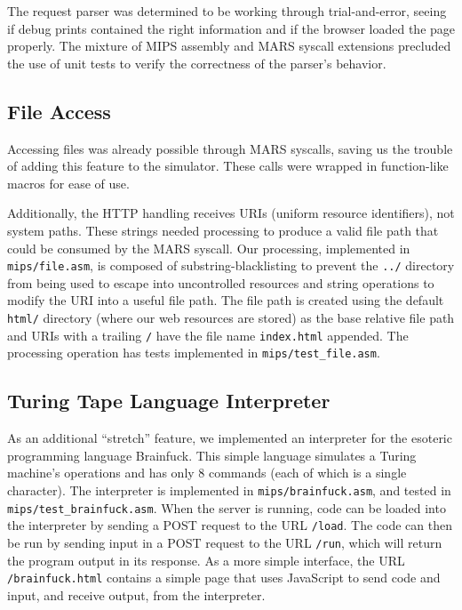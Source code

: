 \documentclass[journal,10pt]{IEEEtran}
\begin{document}
The request parser was determined to be working through trial-and-error, seeing
if debug prints contained the right information and if the browser loaded the
page properly. The mixture of MIPS assembly and MARS syscall extensions
precluded the use of unit tests to verify the correctness of the parser's
behavior.

\subsection{File Access}

Accessing files was already possible through MARS syscalls, saving us the
trouble of adding this feature to the simulator. These calls were wrapped in
function-like macros for ease of use.

Additionally, the HTTP handling receives URIs (uniform resource identifiers),
not system paths. These strings needed processing to produce a valid file path
that could be consumed by the MARS syscall. Our processing, implemented in
\texttt{mips/file.asm}, is composed of substring-blacklisting to prevent the
\texttt{../} directory from being used to escape into uncontrolled resources and
string operations to modify the URI into a useful file path. The file path is
created using the default \texttt{html/} directory (where our web resources are
stored) as the base relative file path and URIs with a trailing \texttt{/} have
the file name \texttt{index.html} appended. The processing operation has tests
implemented in \texttt{mips/test\_file.asm}.

\subsection{Turing Tape Language Interpreter}

As an additional ``stretch'' feature, we implemented an interpreter for the
esoteric programming language Brainfuck\cite{Mpreu/preller}.  This simple
language simulates a Turing machine's operations and has only 8 commands (each
of which is a single character).  The interpreter is implemented in
\texttt{mips/brainfuck.asm}, and tested in \texttt{mips/test\_brainfuck.asm}.
When the server is running, code can be loaded into the interpreter by sending a
POST request to the URL \texttt{/load}.  The code can then be run by sending
input in a POST request to the URL \texttt{/run}, which will return the program
output in its response.  As a more simple interface, the URL
\texttt{/brainfuck.html} contains a simple page that uses JavaScript to send
code and input, and receive output, from the interpreter.
\end{document}
